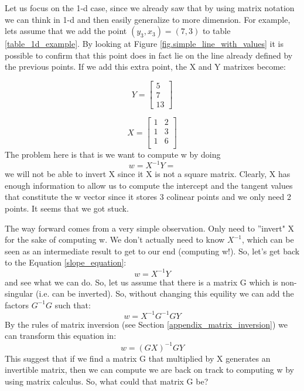 Let us focus on the 1-d case, since we already saw that by using matrix notation we can think in 1-d and then easily generalize to more dimension. For example, lets assume that we add the point $(y_3, x_3)=(7,3)$ to table \ref{table_1d_example}. By looking at Figure \ref{fig.simple_line_with_values} it is possible to confirm that this point does in fact lie on the line already defined by the previous points. If we add this extra point, the X and Y matrixes become: 

\begin{equation}
Y =
\begin{bmatrix}
5\\
7\\
13
\end{bmatrix}
\end{equation}

\begin{equation}
X = 
\begin{bmatrix}
1&2\\
1&3\\
1&6\\
\end{bmatrix}
\end{equation}
The problem here is that is we want to compute w by doing
\begin{equation}
w = X^{-1} Y = 
\end{equation}
we will not be able to invert X since it X is not a square matrix. Clearly, X has enough information to allow us to compute the intercept and the tangent values that constitute the w vector since it stores 3 colinear points and we only need 2 points. It seems that we got stuck.

The way forward comes from a very simple observation. Only need to ''invert" X for the sake of computing w. We don't actually need to know $X^{-1}$, which can be seen as an intermediate result to get to our end (computing w!). So, let's get back to the Equation \ref{slope_equation}:
\begin{equation}
w = X^{-1} Y
\end{equation}
and see what we can do. So, let us assume that there is a matrix G which is non-singular (i.e. can be inverted). So, without changing this equility we can add the factors $G^{-1} G$ such that:
\begin{equation}
w = X^{-1} G^{-1} G Y
\end{equation}
By the rules of matrix inversion (see Section \ref{appendix_matrix_inversion}) we can transform this equation in:
\begin{equation}
w = (G X)^{-1} G Y 
\end{equation}
This suggest that if we find a matrix G that multiplied by X generates an invertible matrix, then we can compute we are back on track to computing w by using matrix calculus. So, what could that matrix G be?

